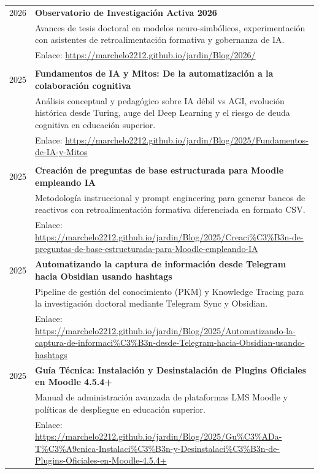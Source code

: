 \documentclass[a4paper]{article}
\begin{document}
\begin{longtable}{r|p{14.2cm}}
\textsc{2026} & \textbf{Observatorio de Investigación Activa 2026} \\
& \small Avances de tesis doctoral en modelos neuro-simbólicos, experimentación con asistentes de retroalimentación formativa y gobernanza de IA. \\
& \small Enlace: \url{https://marchelo2212.github.io/jardin/Blog/2026/} \\
\multicolumn{2}{c}{} \\

\textsc{2025} & \textbf{Fundamentos de IA y Mitos: De la automatización a la colaboración cognitiva} \\
& \small Análisis conceptual y pedagógico sobre IA débil vs AGI, evolución histórica desde Turing, auge del Deep Learning y el riesgo de deuda cognitiva en educación superior. \\
& \small Enlace: \url{https://marchelo2212.github.io/jardin/Blog/2025/Fundamentos-de-IA-y-Mitos} \\
\multicolumn{2}{c}{} \\

\textsc{2025} & \textbf{Creación de preguntas de base estructurada para Moodle empleando IA} \\
& \small Metodología instruccional y prompt engineering para generar bancos de reactivos con retroalimentación formativa diferenciada en formato CSV. \\
& \small Enlace: \url{https://marchelo2212.github.io/jardin/Blog/2025/Creaci%C3%B3n-de-preguntas-de-base-estructurada-para-Moodle-empleando-IA} \\
\multicolumn{2}{c}{} \\

\textsc{2025} & \textbf{Automatizando la captura de información desde Telegram hacia Obsidian usando hashtags} \\
& \small Pipeline de gestión del conocimiento (PKM) y Knowledge Tracing para la investigación doctoral mediante Telegram Sync y Obsidian. \\
& \small Enlace: \url{https://marchelo2212.github.io/jardin/Blog/2025/Automatizando-la-captura-de-informaci%C3%B3n-desde-Telegram-hacia-Obsidian-usando-hashtags} \\
\multicolumn{2}{c}{} \\

\textsc{2025} & \textbf{Guía Técnica: Instalación y Desinstalación de Plugins Oficiales en Moodle 4.5.4+} \\
& \small Manual de administración avanzada de plataformas LMS Moodle y políticas de despliegue en educación superior. \\
& \small Enlace: \url{https://marchelo2212.github.io/jardin/Blog/2025/Gu%C3%ADa-T%C3%A9cnica-Instalaci%C3%B3n-y-Desinstalaci%C3%B3n-de-Plugins-Oficiales-en-Moodle-4.5.4+} \\
\multicolumn{2}{c}{} \\


\end{longtable}
\end{document}
